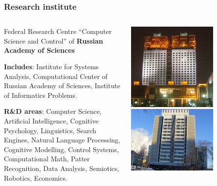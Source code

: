 \documentclass[default]{beamer}
\begin{document}
	\begin{frame}
		\frametitle{Research institute}
		
		\begin{columns}
			\begin{column}{0.6\textwidth}
				Federal Research Centre ``Computer Science and Control'' of \textbf{Russian Academy of Sciences}
				\par\bigskip
				\textbf{Includes}: Institute for Systems Analysis, Computational Center of Russian Academy of Sciences, Institute of Informatics Problems.
				\par\bigskip
				\textbf{R\&D areas}: Computer Science, Artificial Intelligence, Cognitive Psychology, Linguistics, Search Engines, Natural Language Processing, Cognitive Modelling, Control Systems, Computational Math, Patter Recognition, Data Analysis, Semiotics, Robotics, Economics.
			\end{column}
			\begin{column}{0.4\textwidth}
				\centering
				\includegraphics[width=0.7\textwidth]{misc/origin_ras.jpg}
				\vspace{10pt}
				\includegraphics[width=0.7\textwidth]{advert/isa_build.jpg}
			\end{column}
		\end{columns}
		
	\end{frame}
					
\end{document}
